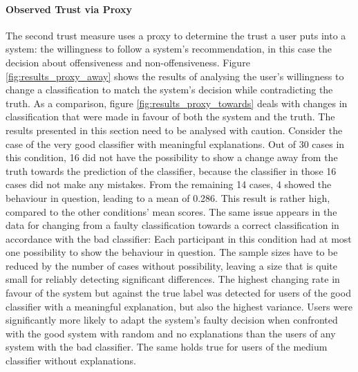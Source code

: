 \paragraph{Observed Trust via Proxy}
The second trust measure uses a proxy to determine the trust a user puts into a system: the willingness to follow a system's recommendation, in this case the decision about offensiveness and non-offensiveness. Figure \ref{fig:results_proxy_away} shows the results of analysing the user's willingness to change a classification to match the system's decision while contradicting the truth. As a comparison, figure \ref{fig:results_proxy_towards} deals with changes in classification that were made in favour of both the system and the truth.\newline
The results presented in this section need to be analysed with caution. Consider the case of the very good classifier with meaningful explanations. Out of 30 cases in this condition, 16 did not have the possibility to show a change away from the truth towards the prediction of the classifier, because the classifier in those 16 cases did not make any mistakes. From the remaining 14 cases, 4 showed the behaviour in question, leading to a mean of 0.286. This result is rather high, compared to the other conditions' mean scores. The same issue appears in the data for changing from a faulty classification towards a correct classification in accordance with the bad classifier: Each participant in this condition had at most one possibility to show the behaviour in question. The sample sizes have to be reduced by the number of cases without possibility, leaving a size that is quite small for reliably detecting significant differences.\newline
The highest changing rate in favour of the system but against the true label was detected for users of the good classifier with a meaningful explanation, but also the highest variance. Users were significantly more likely to adapt the system's faulty decision when confronted with the good system with random and no explanations than the users of any system with the bad classifier. The same holds true for users of the medium classifier without explanations.\newline


